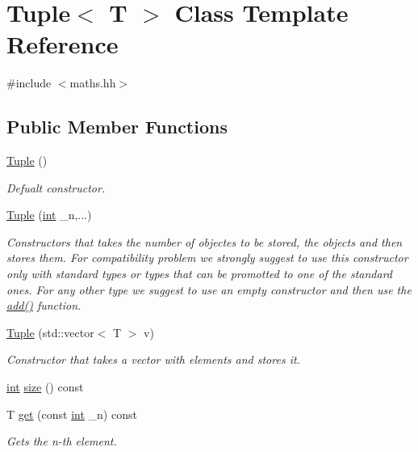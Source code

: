 \hypertarget{class_tuple}{}\section{Tuple$<$ T $>$ Class Template Reference}
\label{class_tuple}


{\ttfamily \#include $<$maths.\+hh$>$}

\subsection*{Public Member Functions}
\begin{DoxyCompactItemize}
\item 
\mbox{\hyperlink{class_tuple_ae8bde0e2215d6d5235a2a45195f7bfae}{Tuple}} ()
\begin{DoxyCompactList}\small\item\em Defualt constructor. \end{DoxyCompactList}\item 
\mbox{\hyperlink{class_tuple_af64f6017bf08af095addedf084863f22}{Tuple}} (\mbox{\hyperlink{draw_8hh_aa620a13339ac3a1177c86edc549fda9b}{int}} \+\_\+n,...)
\begin{DoxyCompactList}\small\item\em Constructors that takes the number of objectes to be stored, the objects and then stores them. For compatibility problem we strongly suggest to use this constructor only with standard types or types that can be promotted to one of the standard ones. For any other type we suggest to use an empty constructor and then use the {\ttfamily \mbox{\hyperlink{class_tuple_a5d3ee2809d790543195a6e2075aef7d0}{add()}}} function. \end{DoxyCompactList}\item 
\mbox{\hyperlink{class_tuple_adff6ec647c0f16a061adae02814ad45e}{Tuple}} (std\+::vector$<$ T $>$ v)
\begin{DoxyCompactList}\small\item\em Constructor that takes a vector with elements and stores it. \end{DoxyCompactList}\item 
\mbox{\hyperlink{draw_8hh_aa620a13339ac3a1177c86edc549fda9b}{int}} \mbox{\hyperlink{class_tuple_a8fffdb4c6d86d10fcf4aee1b0261e4ba}{size}} () const
\item 
T \mbox{\hyperlink{class_tuple_aabf82c5d0f19c9a8f6a8f01d95801162}{get}} (const \mbox{\hyperlink{draw_8hh_aa620a13339ac3a1177c86edc549fda9b}{int}} \+\_\+n) const
\begin{DoxyCompactList}\small\item\em Gets the n-\/th element. \end{DoxyCompactList}\item 

\end{DoxyCompactItemize}
